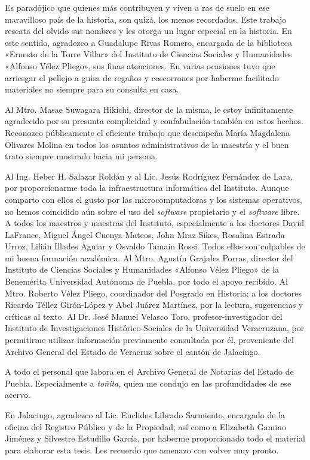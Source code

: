 \documentclass[14pt,twoside,final]{extbook} %
\begin{document}
Es paradójico que quienes más contribuyen y viven a ras de suelo en ese maravilloso país de la historia, son quizá, los menos recordados. Este trabajo rescata del olvido sus nombres y les otorga un lugar especial en la historia. En este sentido, agradezco a Guadalupe Rivas Romero, encargada de la biblioteca «Ernesto de la Torre Villar» del Instituto de Ciencias Sociales y Humanidades «Alfonso Vélez Pliego», sus finas atenciones. En varias ocasiones tuvo que arriesgar el pellejo a guisa de regaños y coscorrones por haberme facilitado materiales no siempre para su consulta en casa.

Al Mtro. Masae Suwagara Hikichi, director de la misma, le estoy infinitamente agradecido por su presunta complicidad y confabulación también en estos hechos. Reconozco públicamente el eficiente trabajo que desempeña María Magdalena Olivares Molina en todos los asuntos administrativos de la maestría y el buen trato siempre mostrado hacia mi persona.

Al Ing. Heber H. Salazar Roldán y al Lic. Jesús Rodríguez Fernández de Lara, por proporcionarme toda la infraestructura informática del Instituto. Aunque comparto con ellos el gusto por las microcomputadoras y los sistemas operativos, no hemos coincidido aún sobre el uso del \emph{software} propietario y el \emph{software} libre. A todos los maestros y maestras del Instituto, especialmente a los doctores David LaFrance, Miguel Ángel Cuenya Mateos, John Mraz Sikes, Rosalina Estrada Urroz, Lilián Illades Aguiar y Osvaldo Tamain Rossi. Todos ellos son culpables de mi buena formación académica. Al Mtro. Agustín Grajales Porras, director del Instituto de Ciencias Sociales y Humanidades «Alfonso Vélez Pliego» de la Benemérita Universidad Autónoma de Puebla, por todo el apoyo recibido. Al Mtro. Roberto Vélez Pliego, coordinador del Posgrado en Historia; a los doctores Ricardo Téllez Girón-López y Abel Juárez Martínez, por la lectura, sugerencias y críticas al texto. Al Dr. José Manuel Velasco Toro, profesor-investigador del Instituto de Investigaciones Histórico-Sociales de la Universidad Veracruzana, por permitirme utilizar información previamente consultada por él, proveniente del Archivo General del Estado de Veracruz sobre el cantón de Jalacingo.

A todo el personal que labora en el Archivo General de Notarías del Estado de Puebla. Especialmente a \emph{toñita,} quien me condujo en las profundidades de ese acervo.

En Jalacingo, agradezco al Lic. Euclides Librado Sarmiento, encargado de la oficina del Registro Público y de la Propiedad; así como a Elizabeth Gamino Jiménez y Silvestre Estudillo García, por haberme proporcionado todo el material para elaborar esta tesis. Les recuerdo que amenazo con volver muy pronto.
\end{document}
